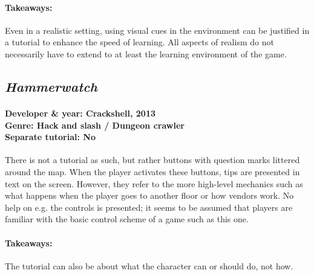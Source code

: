 \paragraph{Takeaways:}
Even in a realistic setting, using visual cues in the environment can be justified in a tutorial to enhance the speed of learning. All aspects of realism do not necessarily have to extend to at least the learning environment of the game.

\subsection{\textit{Hammerwatch}}
\paragraph{Developer \& year: Crackshell, 2013 \\ Genre: Hack and slash / Dungeon crawler \\ Separate tutorial: No \\}
There is not a tutorial as such, but rather buttons with question marks littered around the map. When the player activates these buttons, tips are presented in text on the screen. However, they refer to the more high-level mechanics such as what happens when the player goes to another floor or how vendors work. No help on e.g. the controls is presented; it seems to be assumed that players are familiar with the basic control scheme of a game such as this one.
\paragraph{Takeaways:}
The tutorial can also be about what the character can or should do, not how.




